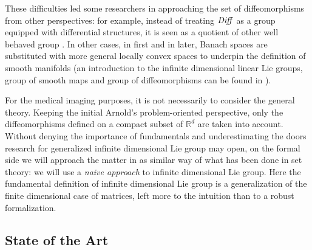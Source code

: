 These difficulties led some researchers in approaching the set of diffeomorphisms from other perspectives: 
for example, instead of treating $\text{\emph{Diff}}$ as a group equipped with differential structures, it is seen as a quotient of other well behaved group \cite{wojtynski1994one}. In other cases, in \cite{marsden1970hamiltonian} first and in \cite{milnor1984remarks} later, Banach spaces are substituted with more general locally convex spaces to underpin the definition of smooth manifolds (an introduction to the infinite dimensional linear Lie groups, group of smooth maps and group of diffeomorphisms can be found in \cite{neeb2006infinite}).

For the medical imaging purposes, it is not necessarily to consider the general theory. Keeping the initial Arnold's problem-oriented perspective, only the diffeomorphisms defined on a compact subset of $\mathbb{R}^d$ are taken into account. Without denying the importance of fundamentals and underestimating the doors research for generalized infinite dimensional Lie group may open, on the formal side we will approach the matter in as similar way of what has been done in set theory: we will use a \emph{naive approach} to infinite dimensional Lie group. Here the fundamental definition of infinite dimensional Lie group is a generalization of the finite dimensional case of matrices, left more to the intuition than to a robust formalization. 

\subsection{State of the Art}\label{se:state_of_the_art}

